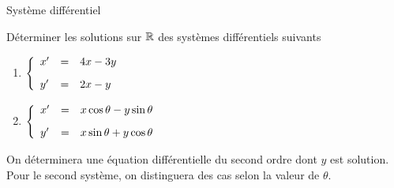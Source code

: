 \documentclass[a4paper, 11pt,reqno]{article}
\begin{document}
 Syst\`eme diff\'erentiel
\begin{exercice}  \;
D\'eterminer les solutions sur $\mathbb{R}$ des syst\`emes diff\'erentiels suivants
\begin{enumerate}
\item $\left\lbrace\begin{array}{lll} 
x^{\prime}&=& 4x-3y\vsec\\y^{\prime}&=& 2x-y     \end{array}\right.$
\item $\left\lbrace\begin{array}{lll} x^{\prime}&=& x\cos{\theta}-y\sin{\theta}\vsec\\y^{\prime}&=& x\sin{\theta}+y\cos{\theta}     \end{array}\right.$
\end{enumerate}
On d\'eterminera une \'equation diff\'erentielle du second ordre dont $y$ est solution. Pour le second syst\`eme, on distinguera des cas selon la valeur de $\theta$.
\end{exercice}
\end{document}

